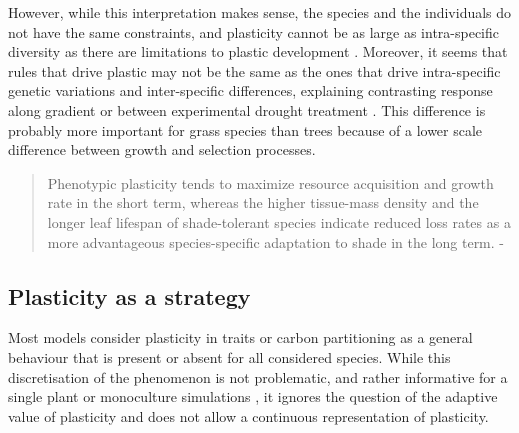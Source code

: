 {%
However, while this interpretation makes sense, the species and the individuals do not have the same constraints, and plasticity cannot be as large as intra-specific diversity as there are limitations to plastic development \parencite{dewitt_costs_1998, auld_re-evaluating_2009}. Moreover, it seems that rules that drive plastic may not be the same as the ones that drive intra-specific genetic variations  and inter-specific differences\parencite{ryser_consequences_2000}, explaining contrasting response along gradient or between experimental drought treatment \parencite{kichenin_contrasting_2013, jung_intraspecific_2014}. This difference is probably more important for grass species than trees \parencite{franklin_modeling_2012} because of a lower scale difference between growth and selection processes.

\begin{quotation}
Phenotypic plasticity tends to maximize resource acquisition and growth rate in the short term, whereas the higher tissue-mass density and the longer leaf lifespan of shade-tolerant species indicate reduced loss rates as a more advantageous species-specific adaptation to shade in the long term. - \cite{ryser_consequences_2000}
\end{quotation}




\subsection{Plasticity as a strategy}

Most models consider plasticity in traits or carbon partitioning as a general behaviour that is present or absent for all considered species. While this discretisation of the phenomenon is not problematic, and rather informative for a single plant or monoculture simulations \cite{maire_plasticity_2013}, it ignores the question of the adaptive value of plasticity and does not allow a continuous representation of plasticity.

}
